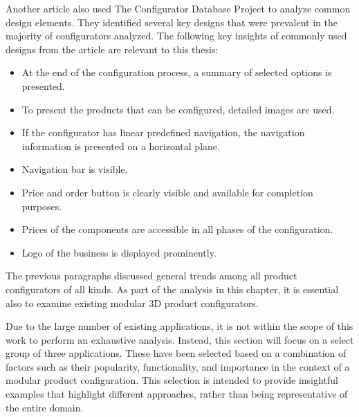 Another article \cite{Leitner2014} also used The Configurator Database Project to analyze common design elements. They identified several key designs that were prevalent in the majority of configurators analyzed. The following key insights of commonly used designs from the article are relevant to this thesis:
\begin{itemize}
    \item At the end of the configuration process, a summary of selected options is presented.
    \item To present the products that can be configured, detailed images are used.
    \item If the configurator has linear predefined navigation, the navigation information is presented on a horizontal plane.
    \item Navigation bar is visible.
    \item Price and order button is clearly visible and available for completion purposes.
    \item Prices of the components are accessible in all phases of the configuration.
    \item Logo of the business is displayed prominently.
\end{itemize}

The previous paragraphs discussed general trends among all product configurators of all kinds. As part of the analysis in this chapter, it is essential also to examine existing modular 3D product configurators. 

Due to the large number of existing applications, it is not within the scope of this work to perform an exhaustive analysis. Instead, this section will focus on a select group of three applications. These have been selected based on a combination of factors such as their popularity, functionality, and importance in the context of a modular product configuration. This selection is intended to provide insightful examples that highlight different approaches, rather than being representative of the entire domain.

